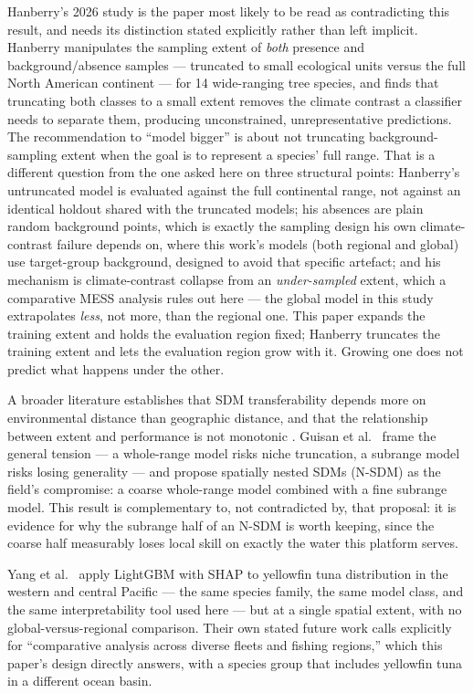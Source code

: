 Hanberry's 2026 study \citep{hanberry2026} is the paper most likely to be read as contradicting this
result, and needs its distinction stated explicitly rather than left implicit.
Hanberry manipulates the sampling extent of \emph{both} presence and
background/absence samples --- truncated to small ecological units versus the
full North American continent --- for 14 wide-ranging tree species, and finds
that truncating both classes to a small extent removes the climate contrast a
classifier needs to separate them, producing unconstrained, unrepresentative
predictions. The recommendation to ``model bigger'' is about not truncating
background-sampling extent when the goal is to represent a species' full
range. That is a different question from the one asked here on three
structural points: Hanberry's untruncated model is evaluated against the full
continental range, not against an identical holdout shared with the truncated
models; his absences are plain random background points, which is exactly the
sampling design his own climate-contrast failure depends on, where this
work's models (both regional and global) use target-group background,
designed to avoid that specific artefact; and his mechanism is climate-contrast
collapse from an \emph{under-sampled} extent, which a comparative MESS
analysis rules out here --- the global model in this study extrapolates
\emph{less}, not more, than the regional one. This paper expands the training
extent and holds the evaluation region fixed; Hanberry truncates the training
extent and lets the evaluation region grow with it. Growing one does not
predict what happens under the other.

 A broader literature establishes
that SDM transferability depends more on environmental distance than
geographic distance, and that the relationship between extent and performance
is not monotonic \citep{seuren2025,gantchoff2022}. Guisan et al.\ \citep{guisan2025} frame
the general tension --- a whole-range model risks niche truncation, a
subrange model risks losing generality --- and propose spatially nested SDMs
(N-SDM) as the field's compromise: a coarse whole-range model combined with a
fine subrange model. This result is complementary to, not contradicted by,
that proposal: it is evidence for why the subrange half of an N-SDM is worth
keeping, since the coarse half measurably loses local skill on exactly the
water this platform serves.

 Yang et al.\ \citep{yang2025}
apply LightGBM with SHAP to yellowfin tuna distribution in the western and
central Pacific --- the same species family, the same model class, and the
same interpretability tool used here --- but at a single spatial extent, with
no global-versus-regional comparison. Their own stated future work calls
explicitly for ``comparative analysis across diverse fleets and fishing
regions,'' which this paper's design directly answers, with a species group
that includes yellowfin tuna in a different ocean basin.

